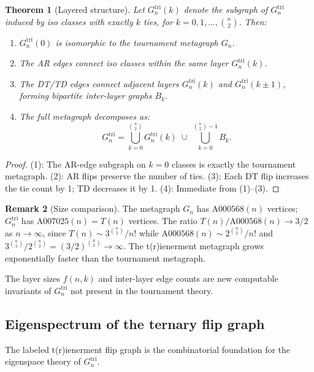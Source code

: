 \documentclass[12pt,reqno]{amsart}
\newtheorem{theorem}{Theorem}[section]
\theoremstyle{definition}
\newtheorem{remark}[theorem]{Remark}
\theoremstyle{plain}
\begin{document}
\begin{theorem}[Layered structure]\label{thm:layers}
Let $G_n^{\mathrm{tri}}(k)$ denote the subgraph of $G_n^{\mathrm{tri}}$ induced by
iso classes with exactly $k$ ties, for $k=0,1,\ldots,\binom{n}{2}$.  Then:
\begin{enumerate}
\item $G_n^{\mathrm{tri}}(0)$ is isomorphic to the tournament metagraph $G_n$.
\item The AR edges connect iso classes within the same layer $G_n^{\mathrm{tri}}(k)$.
\item The DT/TD edges connect adjacent layers $G_n^{\mathrm{tri}}(k)$ and $G_n^{\mathrm{tri}}(k\pm 1)$,
  forming bipartite inter-layer graphs $B_k$.
\item The full metagraph decomposes as:
  \[
    G_n^{\mathrm{tri}}=\bigcup_{k=0}^{\binom{n}{2}}G_n^{\mathrm{tri}}(k)\;\cup\;\bigcup_{k=0}^{\binom{n}{2}-1}B_k.
  \]
\end{enumerate}
\end{theorem}

\begin{proof}
(1): The AR-edge subgraph on $k=0$ classes is exactly the tournament metagraph.
(2): AR flips preserve the number of ties.
(3): Each DT flip increases the tie count by 1; TD decreases it by 1.
(4): Immediate from (1)--(3).
\end{proof}

\begin{remark}[Size comparison]
The metagraph $G_n$ has $\mathrm{A000568}(n)$ vertices; $G_n^{\mathrm{tri}}$ has
$\mathrm{A007025}(n)=T(n)$ vertices.  The ratio
$T(n)/\mathrm{A000568}(n)\to 3/2$ as $n\to\infty$, since
$T(n)\sim 3^{\binom{n}{2}}/n!$ while $\mathrm{A000568}(n)\sim 2^{\binom{n}{2}}/n!$
and $3^{\binom{n}{2}}/2^{\binom{n}{2}}=(3/2)^{\binom{n}{2}}\to\infty$.
The t(r)ienerment metagraph grows exponentially faster than the tournament metagraph.
\end{remark}

The layer sizes $f(n,k)$ and inter-layer edge counts are new computable invariants
of $G_n^{\mathrm{tri}}$ not present in the tournament theory.

\subsection{Eigenspectrum of the ternary flip graph}
\label{ssec:eigenspectrum}

The labeled t(r)ienerment flip graph is the combinatorial foundation for the
eigenspace theory of $G_n^{\mathrm{tri}}$.
\end{document}
